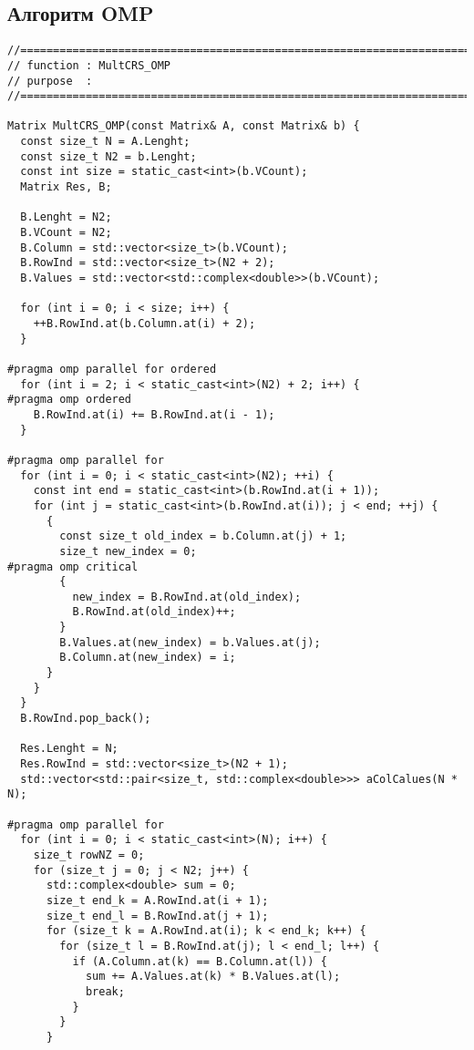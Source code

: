 \documentclass{report}
\begin{document}
\subsection*{Алгоритм OMP}
\begin{lstlisting}
//=======================================================================
// function : MultCRS_OMP
// purpose  :
//=======================================================================

Matrix MultCRS_OMP(const Matrix& A, const Matrix& b) {
  const size_t N = A.Lenght;
  const size_t N2 = b.Lenght;
  const int size = static_cast<int>(b.VCount);
  Matrix Res, B;

  B.Lenght = N2;
  B.VCount = N2;
  B.Column = std::vector<size_t>(b.VCount);
  B.RowInd = std::vector<size_t>(N2 + 2);
  B.Values = std::vector<std::complex<double>>(b.VCount);

  for (int i = 0; i < size; i++) {
    ++B.RowInd.at(b.Column.at(i) + 2);
  }

#pragma omp parallel for ordered
  for (int i = 2; i < static_cast<int>(N2) + 2; i++) {
#pragma omp ordered
    B.RowInd.at(i) += B.RowInd.at(i - 1);
  }

#pragma omp parallel for
  for (int i = 0; i < static_cast<int>(N2); ++i) {
    const int end = static_cast<int>(b.RowInd.at(i + 1));
    for (int j = static_cast<int>(b.RowInd.at(i)); j < end; ++j) {
      {
        const size_t old_index = b.Column.at(j) + 1;
        size_t new_index = 0;
#pragma omp critical
        {
          new_index = B.RowInd.at(old_index);
          B.RowInd.at(old_index)++;
        }
        B.Values.at(new_index) = b.Values.at(j);
        B.Column.at(new_index) = i;
      }
    }
  }
  B.RowInd.pop_back();

  Res.Lenght = N;
  Res.RowInd = std::vector<size_t>(N2 + 1);
  std::vector<std::pair<size_t, std::complex<double>>> aColCalues(N * N);

#pragma omp parallel for
  for (int i = 0; i < static_cast<int>(N); i++) {
    size_t rowNZ = 0;
    for (size_t j = 0; j < N2; j++) {
      std::complex<double> sum = 0;
      size_t end_k = A.RowInd.at(i + 1);
      size_t end_l = B.RowInd.at(j + 1);
      for (size_t k = A.RowInd.at(i); k < end_k; k++) {
        for (size_t l = B.RowInd.at(j); l < end_l; l++) {
          if (A.Column.at(k) == B.Column.at(l)) {
            sum += A.Values.at(k) * B.Values.at(l);
            break;
          }
        }
      }


\end{lstlisting}
\end{document}
